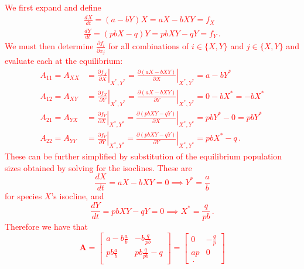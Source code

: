 \documentclass{article}
\begin{document}
\textcolor{red}{
We first expand and define
	\begin{align*}
		\frac{dX}{dt} = (a-bY)X = aX-bXY = f_X \\
		\frac{dY}{dt} = (pbX - q)Y = pb XY - qY = f_Y \, .
	\end{align*}
We must then determine $\frac{ \partial f_i  }{\partial x_j}$ for all combinations of $i \in \{X, Y\}$ and $j \in \{X, Y\}$ and evaluate each at the equilibrium:
	\begin{align*}
		A_{11} = A_{XX} & =  \left . \frac{\partial{f_X}}{\partial X} \right \vert_{X^*, Y^*} = \left . \frac{\partial (a X - b X Y)}{\partial X} \right \vert_{X^*, Y^*}  = a - b Y^*\\
		A_{12} = A_{XY} & =  \left . \frac{\partial{f_X}}{\partial Y} \right \vert_{X^*, Y^*} = \left . \frac{\partial (a X -  b X Y)}{\partial Y} \right \vert_{X^*, Y^*}  = 0 - b X^* =   -b X^*\\
		A_{21} = A_{YX} & =  \left . \frac{\partial{f_Y}}{\partial X} \right \vert_{X^*, Y^*}  = \left . \frac{\partial (p b X Y - q Y)}{\partial X} \right \vert_{X^*, Y^*} = p b Y^* - 0 = p b Y^*\\
		A_{22} = A_{YY} & =  \left . \frac{\partial{f_Y}}{\partial Y} \right \vert_{X^*, Y^*} = \left . \frac{\partial (p b X Y - q Y)}{\partial Y} \right \vert_{X^*, Y^*} = p b X^* - q \, .
	\end{align*}
These can be further simplified by substitution of the equilibrium population sizes obtained by solving for the isoclines.  These are
	\begin{equation*}
		\frac{dX}{dt}= aX - b X Y = 0  \implies Y^* = \frac{a}{b}
	\end{equation*}
for species $X$'s isocline, and
	\begin{equation*}
		\frac{dY}{dt} = p b X Y - q Y = 0 \implies X^* = \frac{q}{p b} \, .
	\end{equation*}
Therefore we have that 
	\begin{equation*}
		\mathbf{A} = 
		\begin{bmatrix}
			a - b \tfrac{a}{b} & -b \tfrac{q}{p b} \\
			p b \tfrac{a}{b} & p b \tfrac{q}{p b} - q \\
		\end{bmatrix}
		=
		\begin{bmatrix}
			0 & - \tfrac{q}{p} \\
			a p & 0 \\ \, .
		\end{bmatrix}	
	\end{equation*}
}
\end{document}
